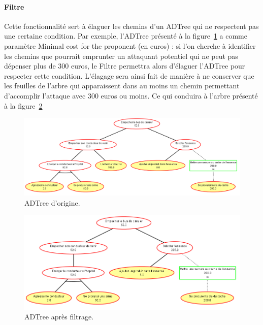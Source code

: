 \paragraph{Filtre} Cette fonctionnalité sert à élaguer les chemins d'un ADTree qui ne respectent pas une certaine condition. Par exemple, l'ADTree présenté à la {\sc figure}~\ref{fig:arbreOrigine} a comme paramètre \og Minimal cost for the proponent \fg (en euros) : si l'on cherche à identifier les chemins que pourrait emprunter un attaquant potentiel qui ne peut pas dépenser plus de 300 euros, le Filtre permettra alors d'élaguer l'ADTree pour respecter cette condition. L'élagage sera ainsi fait de manière à ne conserver que les feuilles de l'arbre qui apparaissent dans au moins un chemin permettant d'accomplir l'attaque avec 300 euros ou moins. Ce qui conduira à l'arbre présenté à la {\sc figure}~\ref{fig:arbreFiltre}

 \begin{figure}[H]
        \centering
        \hspace*{-2.8cm}
        \includegraphics[height=0.5\textwidth]{figure/arbreOrigine.png}
        \caption{ADTree d'origine.}
        \label{fig:arbreOrigine}
    \end{figure}

 \begin{figure}[H]
        \centering
        \hspace*{-1.2cm}
        \includegraphics[height=0.5\textwidth]{figure/arbreFiltre.png}
        \caption{ADTree après filtrage.}
        \label{fig:arbreFiltre}
    \end{figure}

